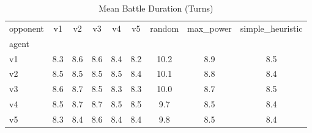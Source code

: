 \begin{table}[htbp]
\caption{Mean Battle Duration (Turns)}
\label{tab:doubles_turns}
\begin{tabular}{lcccccccc}
\hline
opponent & v1 & v2 & v3 & v4 & v5 & random & max_power & simple_heuristic \\
agent &  &  &  &  &  &  &  &  \\
\hline
v1 & 8.3 & 8.6 & 8.6 & 8.4 & 8.2 & 10.2 & 8.9 & 8.5 \\
v2 & 8.5 & 8.5 & 8.5 & 8.5 & 8.4 & 10.1 & 8.8 & 8.4 \\
v3 & 8.6 & 8.7 & 8.5 & 8.3 & 8.3 & 10.0 & 8.7 & 8.5 \\
v4 & 8.5 & 8.7 & 8.7 & 8.5 & 8.5 & 9.7 & 8.5 & 8.4 \\
v5 & 8.3 & 8.4 & 8.6 & 8.4 & 8.4 & 9.8 & 8.5 & 8.4 \\
\hline
\end{tabular}
\end{table}
